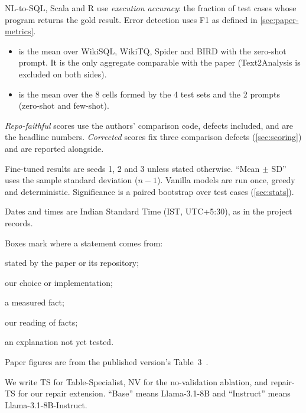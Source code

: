 \begin{description}[style=nextline,leftmargin=1.2em]
\item[Metrics.] NL-to-SQL, Scala and R use \emph{execution accuracy}: the fraction of test cases whose program
returns the gold result. Error detection uses F1 as defined in \cref{sec:paper-metrics}.
  \begin{itemize}
  \item \ZSiv{} is the mean over WikiSQL, WikiTQ, Spider and BIRD with the zero-shot prompt. It is the only aggregate
  comparable with the paper (Text2Analysis is excluded on both sides).
  \item \Mviii{} is the mean over the 8 cells formed by the 4 test sets and the 2 prompts (zero-shot and few-shot).
  \end{itemize}
\item[Scores.] \emph{Repo-faithful} scores use the authors' comparison code, defects included, and are the headline
numbers. \emph{Corrected} scores fix three comparison defects (\cref{sec:scoring}) and are reported alongside.
\item[Seeds and statistics.] Fine-tuned results are seeds 1, 2 and 3 unless stated otherwise. ``Mean $\pm$ SD'' uses
the sample standard deviation ($n-1$). Vanilla models are run once, greedy and deterministic. Significance is a paired
bootstrap over test cases (\cref{sec:stats}).
\item[Dates.] Dates and times are Indian Standard Time (IST, UTC+5:30), as in the project records.
\item[Provenance markers.] Boxes mark where a statement comes from:
  \begin{paperbox}[title={From the original paper},width=\linewidth]
  stated by the paper or its repository;
  \end{paperbox}
  \begin{oursbox}[width=\linewidth]
  our choice or implementation;
  \end{oursbox}
  \begin{observation}[width=\linewidth]a measured fact;\end{observation}
  \begin{interpretation}[width=\linewidth]our reading of facts;\end{interpretation}
  \begin{hypothesis}[width=\linewidth]an explanation not yet tested.\end{hypothesis}
  Paper figures are from the published version's Table~3~\cite{xing2025emnlp}.
\item[Names.] We write TS for Table-Specialist, NV for the no-validation ablation, and repair-TS for our repair
extension. ``Base'' means Llama-3.1-8B and ``Instruct'' means Llama-3.1-8B-Instruct.
\end{description}
